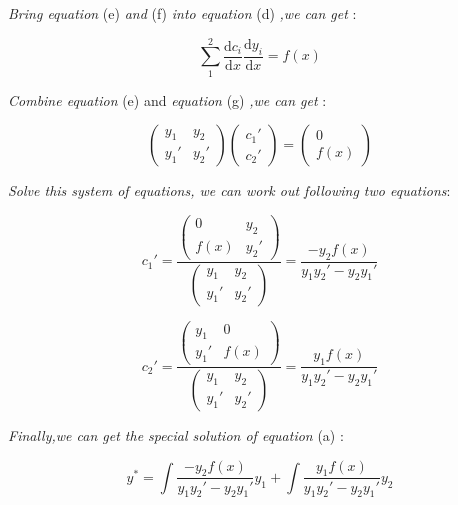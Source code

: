 \textit{Bring equation} (e) \textit{and} (f) \textit{into equation} (d) \textit{,we can get} :

\[\sum_{1}^{2} \frac{\mathrm{d} c_i}{\mathrm{d} x} \frac{\mathrm{d} y_i}{\mathrm{d} x}=f(x) \tag{g}\]

\textit{Combine equation} (e) and \textit{equation} (g) \textit{,we can get} :

\[\begin{pmatrix} y_1 & y_2 \\ {y_1}' & {y_2}' \end{pmatrix} \begin{pmatrix} {c_1}' \\ {c_2}' \end{pmatrix} = \begin{pmatrix} 0 \\ f(x) \end{pmatrix} \tag{h} \]

\textit{Solve this system of equations, we can work out following two equations}:

\[ {c_1}'=\frac {\begin{pmatrix} 0 & y_2 \\ f(x) & {y_2}' \end{pmatrix}} {\begin{pmatrix} y_1 & y_2 \\ {y_1}' & {y_2}' \end{pmatrix}} =\frac {-y_2 f(x)}{y_1 {y_2}' - y_2 {y_1}'} \tag{i1} \]

\[ {c_2}'=\frac {\begin{pmatrix} y_1 & 0 \\ {y_1}' & f(x) \end{pmatrix}} {\begin{pmatrix} y_1 & y_2 \\ {y_1}' & {y_2}' \end{pmatrix}} =\frac {y_1 f(x)}{y_1 {y_2}' - y_2 {y_1}'} \tag{i2} \]

\textit{Finally,we can get the special solution of equation} (a) :

\[y^*=\int{\frac {-y_2 f(x)}{y_1 {y_2}' - y_2 {y_1}'}} y_1 + \int{\frac {y_1 f(x)}{y_1 {y_2}' - y_2 {y_1}'}} y_2 \tag{j} \]


